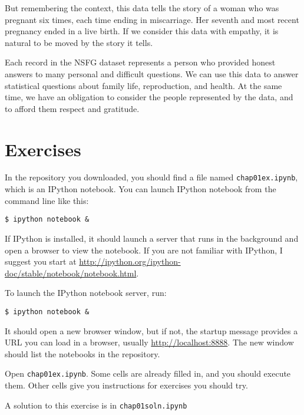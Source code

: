 \documentclass[12pt]{book}
\begin{document}
But remembering the context, this data tells the story of a woman who
was pregnant six times, each time ending in miscarriage.  Her seventh
and most recent pregnancy ended in a live birth.  If we consider this
data with empathy, it is natural to be moved by the story it tells.

Each record in the NSFG dataset represents a person who provided
honest answers to many personal and difficult questions.  We can use
this data to answer statistical questions about family life,
reproduction, and health.  At the same time, we have an obligation
to consider the people represented by the data, and to afford them
respect and gratitude.


\section{Exercises}

\begin{exercise}
In the repository you downloaded, you should find a file named
\verb"chap01ex.ipynb", which is an IPython notebook.  You can
launch IPython notebook from the command line like this:

\begin{verbatim}
$ ipython notebook &
\end{verbatim}

If IPython is installed, it should launch a server that runs in the
background and open a browser to view the notebook.  If you are not
familiar with IPython, I suggest you start at
\url{http://ipython.org/ipython-doc/stable/notebook/notebook.html}.

To launch the IPython notebook server, run:

\begin{verbatim}
$ ipython notebook &
\end{verbatim}

It should open a new browser window, but if not, the startup
message provides a URL you can load in a browser, usually
\url{http://localhost:8888}.  The new window should list the notebooks
in the repository.

Open \verb"chap01ex.ipynb".  Some cells are already filled in, and
you should execute them.  Other cells give you instructions for
exercises you should try.

A solution to this exercise is in \verb"chap01soln.ipynb"
\end{exercise}
\end{document}
